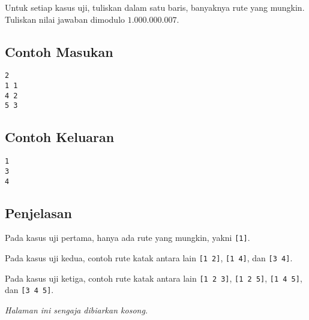 \documentclass{article}
\begin{document}
Untuk setiap kasus uji, tuliskan dalam satu baris, banyaknya rute yang mungkin. Tuliskan nilai jawaban dimodulo $1.000.000.007$.

\begin{multicols}{2}
\subsection*{Contoh Masukan}
\begin{lstlisting}
2
1 1
4 2
5 3
\end{lstlisting}
\columnbreak
\subsection*{Contoh Keluaran}
\begin{lstlisting}
1
3
4
\end{lstlisting}
\vfill
\null
\end{multicols}

\subsection*{Penjelasan}

Pada kasus uji pertama, hanya ada rute yang mungkin, yakni \lstinline{[1]}.

Pada kasus uji kedua, contoh rute katak antara lain \lstinline{[1 2]}, \lstinline{[1 4]}, dan \lstinline{[3 4]}.

Pada kasus uji ketiga, contoh rute katak antara lain \lstinline{[1 2 3]}, \lstinline{[1 2 5]}, \lstinline{[1 4 5]}, dan \lstinline{[3 4 5]}.


\newpage
\vspace*{\fill}
\begin{center}
    \textit{Halaman ini sengaja dibiarkan kosong.}
\end{center}
\vspace*{\fill}
\end{document}
